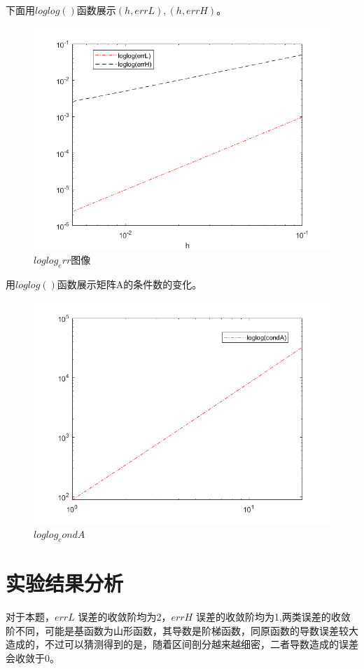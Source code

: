 \documentclass{article}
\begin{document}
下面用$loglog()$函数展示$(h,errL),(h,errH)$。
\begin{figure}[H]
\centering
\includegraphics[scale=0.6]{loglog_err.png}
\caption{\label{loglog_err}$loglog_err$图像}
\end{figure}

\newpage
用$loglog()$函数展示矩阵A的条件数的变化。
\begin{figure}[H]
\centering
\includegraphics[scale=0.5]{loglog_condA.png}
\caption{\label{loglog_condA}$loglog_condA$}
\end{figure}


\section{实验结果分析}
对于本题，$errL$ 误差的收敛阶均为2，$errH$ 误差的收敛阶均为1,两类误差的收敛阶不同，可能是基函数为山形函数，其导数是阶梯函数，同原函数的导数误差较大造成的，不过可以猜测得到的是，随着区间剖分越来越细密，二者导数造成的误差会收敛于0。
\end{document}
